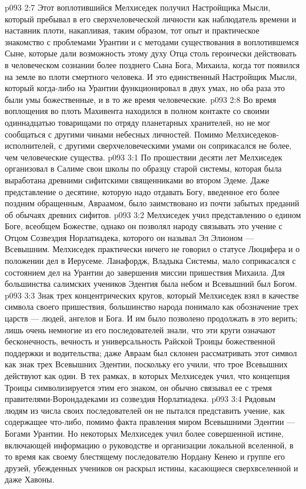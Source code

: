 \vs p093 2:7 \pc Этот воплотившийся Мелхиседек получил Настройщика Мысли, который пребывал в его сверхчеловеческой личности как наблюдатель времени и наставник плоти, накапливая, таким образом, тот опыт и практическое знакомство с проблемами Урантии и с методами существования в воплотившемся Сыне, которые дали возможность этому духу Отца столь героически действовать в человеческом сознании более позднего Сына Бога, Михаила, когда тот появился на земле во плоти смертного человека. И это единственный Настройщик Мысли, который когда\hyp{}либо на Урантии функционировал в двух умах, но оба раза это были умы божественные, и в то же время человеческие.
\vs p093 2:8 Во время воплощения во плоть Махивента находился в полном контакте со своими одиннадцатью товарищами по отряду планетарных хранителей, но не мог сообщаться с другими чинами небесных личностей. Помимо Мелхиседеков\hyp{}исполнителей, с другими сверхчеловеческими умами он соприкасался не более, чем человеческие существа.
\vs p093 3:1 По прошествии десяти лет Мелхиседек организовал в Салиме свои школы по образцу старой системы, которая была выработана древними сифитскими священниками во втором Эдеме. Даже представление о десятине, которую надо отдавать Богу, введенное его более поздним обращенным, Авраамом, было заимствовано из почти забытых преданий об обычаях древних сифитов.
\vs p093 3:2 Мелхиседек учил представлению о едином Боге, всеобщем Божестве, однако он позволял народу связывать это учение с Отцом Созвездия Норлатиадека, которого он называл Эл Элионом --- Всевышним. Мелхиседек практически ничего не говорил о статусе Люцифера и о положении дел в Иерусеме. Ланафордж, Владыка Системы, мало соприкасался с состоянием дел на Урантии до завершения миссии пришествия Михаила. Для большинства салимских учеников Эдентия была небом и Всевышний был Богом.
\vs p093 3:3 Знак трех концентрических кругов, который Мелхиседек взял в качестве символа своего пришествия, большинство народа понимало как обозначение трех царств --- людей, ангелов и Бога. И им было позволено продолжать в это верить; лишь очень немногие из его последователей знали, что эти круги означают бесконечность, вечность и универсальность Райской Троицы божественной поддержки и водительства; даже Авраам был склонен рассматривать этот символ как знак трех Всевышних Эдентии, поскольку его учили, что трое Всевышних действуют как один. В тех рамках, в которых Мелхиседек учил, что концепция Троицы символизируется этим его знаком, он обычно связывал ее с тремя правителями\hyp{}Ворондадеками из созвездия Норлатиадека.
\vs p093 3:4 Рядовым людям из числа своих последователей он не пытался представить учение, как содержащее что\hyp{}либо, помимо факта правления миром Всевышними Эдентии --- Богами Урантии. Но некоторых Мелхиседек учил более совершенной истине, включающей информацию о руководстве и организации локальной вселенной, в то время как своему блестящему последователю Нордану Кенею и группе его друзей, убежденных учеников он раскрыл истины, касающиеся сверхвселенной и даже Хавоны.

